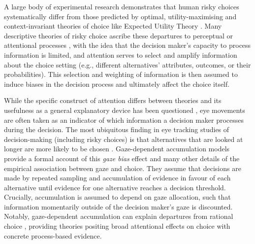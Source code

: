 \documentclass[11pt, a4paper, twocolumn, abstract]{scrartcl}
\begin{document}
A large body of experimental research demonstrates that human risky choices systematically differ from those predicted by optimal, utility-maximising and context-invariant theories of choice like Expected Utility Theory \parencite[e.g.,][]{allais1953ExtensionTheoriesEquilibre,kahneman2012ChoicesValuesFrames,mohr2017AttractionEffectRisky,molter2021GazedependentEvidenceAccumulation,hertwig2004DecisionsExperienceEffect}.
Many descriptive theories of risky choice ascribe these departures to perceptual or attentional processes \parencite[e.g.,][]{tversky1992AdvancesProspectTheory,busemeyer1993DecisionFieldTheory,yechiam2013LossaversionLossattentionImpact}, with the idea that the decision maker's capacity to process information is limited, and attention serves to select and amplify information about the choice setting (e.g., different alternatives' attributes, outcomes, or their probabilities). This selection and weighting of information is then assumed to induce biases in the decision process and ultimately affect the choice itself. 

While the specific construct of attention differs between theories and its usefulness as a general explanatory device has been questioned \parencite{hommel2019NoOneKnows}, eye movements are often taken as an indicator of which information a decision maker processes during the decision. The most ubiquitous finding in eye tracking studies of decision-making (including risky choices) is that alternatives that are looked at longer are more likely to be chosen \parencite{stewart2016EyeMovementsRisky,stewart2016EyeMovementsStrategic,cavanagh2014EyeTrackingPupillometry,isham2013LookingTimePredicts,krajbich2010VisualFixationsComputation,krajbich2011MultialternativeDriftdiffusionModel,gluth2018ValuebasedAttentionalCapture,gluth2020ValuebasedAttentionNot,sepulveda2020VisualAttentionModulates,lopez-persem2016HowPriorPreferences,thomas2019GazeBiasDifferences,thomas2021UncoveringComputationalMechanisms,molter2021GazedependentEvidenceAccumulation,smith2018AttentionChoiceDomains,ashby2016FindingRightFit,glockner2011EyetrackingStudyInformation,fiedler2012DynamicsDecisionMaking}. Gaze-dependent accumulation models \parencite{krajbich2010VisualFixationsComputation,krajbich2011MultialternativeDriftdiffusionModel,krajbich2012AttentionalDriftdiffusionModel,glickman2019FormationPreferenceRisky} provide a formal account of this \emph{gaze bias} effect and many other details of the empirical association between gaze and choice. They assume that decisions are made by repeated sampling and accumulation of evidence in favour of each alternative until evidence for one alternative reaches a decision threshold. Crucially, accumulation is assumed to depend on gaze allocation, such that information momentarily outside of the decision maker's gaze is discounted. 
Notably, gaze-dependent accumulation can explain departures from rational choice \parencite{gluth2018ValuebasedAttentionalCapture,molter2021GazedependentEvidenceAccumulation}, providing theories positing broad attentional effects on choice with concrete process-based evidence.
\end{document}
